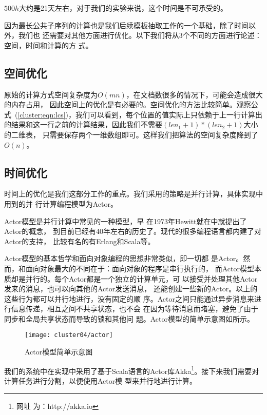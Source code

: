$500h$大约是21天左右，对于我们的实验来说，这个时间是不可承受的。

因为最长公共子序列的计算也是我们后续模板抽取工作的一个基础，除了时间以外，我们也
还需要对其他方面进行优化。以下我们将从3个不同的方面进行论述：空间，时间和计算的方
式。

\subsection{空间优化}
原始的计算方式空间复杂度为$O(mn)$，在文档数很多的情况下，可能会造成很大的内存占用，
因此空间上的优化是有必要的。空间优化的方法比较简单。观察公
式~(\ref{cluster:eqn:lcs})，我们可以看到，每个位置的值实际上只依赖于上一行计算出
的结果和这一行之前的计算结果，因此我们不需要$(len_1 + 1)* (len_2+1)$大小的二维表，
只需要保存两个一维数组即可。这样我们把算法的空间复杂度降到了$O(n)$。

\subsection{时间优化}
时间上的优化是我们这部分工作的重点。我们采用的策略是并行计算，具体实现中用到的并
行计算编程模型为Actor。

Actor模型是并行计算中常见的一种模型，早
在1973年Hewitt就在中就提出了Actor的概念，
到目前已经有40年左右的历史了。现代的很多编程语言都内建了对Actor的支持，
比较有名的有Erlang和Scala等。

Actor模型的基本哲学和面向对象编程的思想非常类似，即一切都
是Actor。然而，和面向对象最大的不同在于：面向对象的程序是串行执行的，
而Actor模型本质却是并行的。每个Actor都是一个独立的计算单元，可
以接受并处理其他Actor发来的消息，也可以向其他的Actor发送消息，
还能创建一些新的Actor。以上的这些行为都可以并行地进行，没有固定的顺
序。Actor之间只能通过异步消息来进行信息传递，相互之间不共享状态，也不会
在因为等待消息而堵塞，避免了由于同步和全局共享状态而导致的锁和其他问
题。Actor模型的简单示意图如所示。

\begin{figure}
  \centering
  \texttt{[image: cluster04/actor]}
  \caption{Actor模型简单示意图}
  \label{cluster:fig:actor}
\end{figure}

我们的系统中在实现中采用了基于Scala语言的Actor库Akka\footnote{网址
  为：http://akka.io}。接下来我们需要对计算任务进行分割，以便使用Actor模
型来并行地进行计算。

